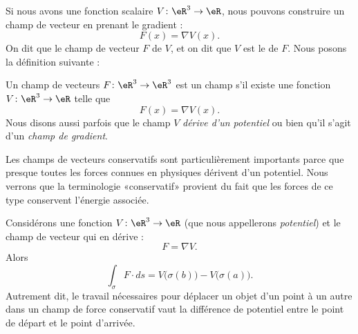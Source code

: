 Si nous avons une fonction scalaire $V\colon \eR^3\to \eR$, nous pouvons construire un champ de vecteur en prenant le gradient :
\begin{equation}
    F(x)=\nabla V(x).
\end{equation}
On dit que le champ de vecteur $F$  de $V$, et on dit que $V$ est le  de $F$. Nous posons la définition suivante :
\begin{definition}
    Un champ de vecteurs $F\colon \eR^3\to \eR^3$ est un champ  s'il existe une fonction $V\colon \eR^3\to \eR$ telle que
    \begin{equation}
        F(x)=\nabla V(x).
    \end{equation}
    Nous disons aussi parfois que le champ $V$ \emph{dérive d'un potentiel} ou bien qu'il s'agit d'un \emph{champ de gradient}.
\end{definition}

Les champs de vecteurs conservatifs sont particulièrement importants parce que presque toutes les forces connues en physiques dérivent d'un potentiel. Nous verrons que la terminologie «conservatif» provient du fait que les forces de ce type conservent l'énergie associée.


\begin{proposition}
    Considérons une fonction $V\colon \eR^3\to \eR$ (que nous appellerons \emph{potentiel}) et le champ de vecteur qui en dérive :
    \begin{equation}
        F=\nabla V.
    \end{equation}
    Alors
    \begin{equation}
        \int_{\sigma}F\cdot ds=V\big( \sigma(b) \big)-V\big( \sigma(a) \big).
    \end{equation}
    Autrement dit, le travail nécessaires pour déplacer un objet d'un point à un autre dans un champ de force conservatif vaut la différence de potentiel entre le point de départ et le point d'arrivée.
\end{proposition}

